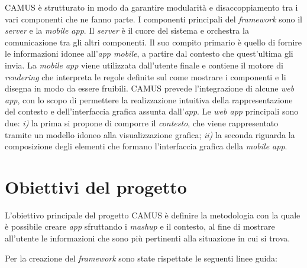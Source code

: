 CAMUS è strutturato in modo da garantire modularità e disaccoppiamento tra i vari componenti che ne fanno parte. I componenti principali del \emph{framework} sono il \emph{server} e la \emph{mobile app}. Il \emph{server} è il cuore del sistema e orchestra la comunicazione tra gli altri componenti. Il suo compito primario è quello di fornire le informazioni idonee all'\emph{app mobile}, a partire dal contesto che quest'ultima gli invia. La \emph{mobile app} viene utilizzata dall'utente finale e contiene il motore di \emph{rendering} che interpreta le regole definite sul come mostrare i componenti e li disegna in modo da essere fruibili.
CAMUS prevede l'integrazione di alcune \emph{web app}, con lo scopo di permettere la realizzazione intuitiva della rappresentazione del contesto e dell'interfaccia grafica assunta dall'\emph{app}. Le \emph{web app} principali sono due: \emph{i)} la prima si propone di comporre il \emph{contesto}, che viene rappresentato tramite un modello idoneo alla visualizzazione grafica; \emph{ii)} la seconda riguarda la composizione degli elementi che formano l'interfaccia grafica della \emph{mobile app}.

\section{Obiettivi del progetto\label{sec:obiettivi-progetto}}

L'obiettivo principale del progetto CAMUS è definire la metodologia con la quale è possibile creare \emph{app} sfruttando i \emph{mashup} e il contesto, al fine di mostrare all'utente le informazioni che sono più pertinenti alla situazione in cui si trova.

Per la creazione del \emph{framework} sono state rispettate le seguenti linee guida:

